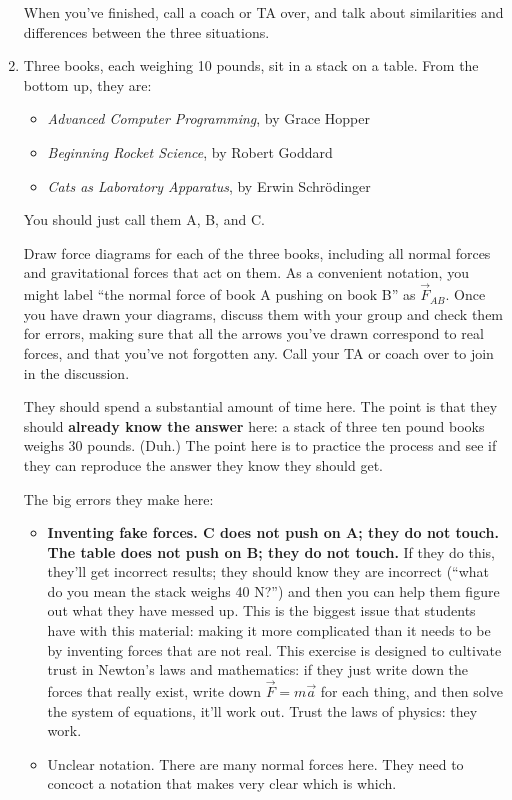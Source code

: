 \documentclass[12pt]{article}
\newcommand{\BI}{\begin{itemize}}
\newcommand{\EI}{\end{itemize}}
\newcommand{\vsi}{\vspace{0.1in}}
\begin{document}
\begin{enumerate}
    When you've finished, call a coach or TA over, and talk about similarities and differences between the three situations. 


\item Three books, each weighing 10 pounds, sit in a stack on a table. From the bottom up, they are:
  \BI
\item {\it Advanced Computer Programming}, by Grace Hopper
\item {\it Beginning Rocket Science}, by Robert Goddard
\item {\it Cats as Laboratory Apparatus}, by Erwin Schr\"odinger
  \EI
     
     You should just call them A, B, and C. 

     Draw force diagrams for each of the three books, including all normal forces and gravitational forces that act on them. As a convenient notation, you might label ``the normal force of book A pushing on book B'' as $\vec F_{AB}$.
Once you have drawn your diagrams, discuss them with your group and check them for errors, making sure that all the arrows you've drawn correspond to real forces, and that you've not forgotten any. Call your TA or coach over to 
join in the discussion.

{\color{Red}
They should spend a substantial amount of time here. The point is that they should {\bf already know the answer} here: a stack of three ten pound books weighs 30 pounds. (Duh.) The point here is to practice the process and see if they can reproduce the answer they know they should get.

The big errors they make here:

\begin{itemize}
	\item {\bf Inventing fake forces. C does not push on A; they do not touch. The table does not push on B; they do not touch.} If they do this, they'll get incorrect results; they should know they are incorrect (``what do you mean the stack weighs 40 N?'') and then you can help them figure out what they have messed up. This is the biggest issue that students have with this material: making it more complicated than it needs to be by inventing forces that are not real. This exercise is designed to cultivate trust in Newton's laws and mathematics: if they just write down the forces that really exist, write down $\vec F = m \vec a$ for each thing, and then solve the system of equations, it'll work out. Trust the laws of physics: they work.
	\item Unclear notation. There are many normal forces here. They need to concoct a notation that makes very clear which is which.
\end{itemize}
}
\vsi\vsi\vsi


\end{enumerate}
\end{document}
